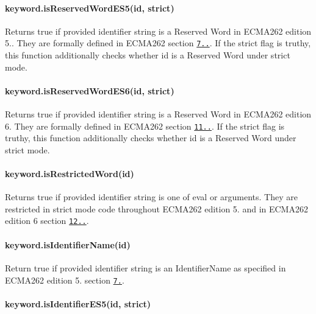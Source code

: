 \paragraph*{keyword.\+is\+Reserved\+Word\+E\+S5(id, strict)}

Returns {\ttfamily true} if provided identifier string is a Reserved Word in E\+C\+M\+A262 edition 5.. They are formally defined in E\+C\+M\+A262 section \href{http://es5.github.io/#x7.6.1}{\tt 7..}. If the {\ttfamily strict} flag is truthy, this function additionally checks whether {\ttfamily id} is a Reserved Word under strict mode.

\paragraph*{keyword.\+is\+Reserved\+Word\+E\+S6(id, strict)}

Returns {\ttfamily true} if provided identifier string is a Reserved Word in E\+C\+M\+A262 edition 6. They are formally defined in E\+C\+M\+A262 section \href{https://people.mozilla.org/~jorendorff/es6-draft.html#sec-reserved-words}{\tt 11..}. If the {\ttfamily strict} flag is truthy, this function additionally checks whether {\ttfamily id} is a Reserved Word under strict mode.

\paragraph*{keyword.\+is\+Restricted\+Word(id)}

Returns {\ttfamily true} if provided identifier string is one of {\ttfamily eval} or {\ttfamily arguments}. They are restricted in strict mode code throughout E\+C\+M\+A262 edition 5. and in E\+C\+M\+A262 edition 6 section \href{https://people.mozilla.org/~jorendorff/es6-draft.html#sec-identifiers-static-semantics-early-errors}{\tt 12..}.

\paragraph*{keyword.\+is\+Identifier\+Name(id)}

Return true if provided identifier string is an Identifier\+Name as specified in E\+C\+M\+A262 edition 5. section \href{https://es5.github.io/#x7.6}{\tt 7.}.

\paragraph*{keyword.\+is\+Identifier\+E\+S5(id, strict)}

